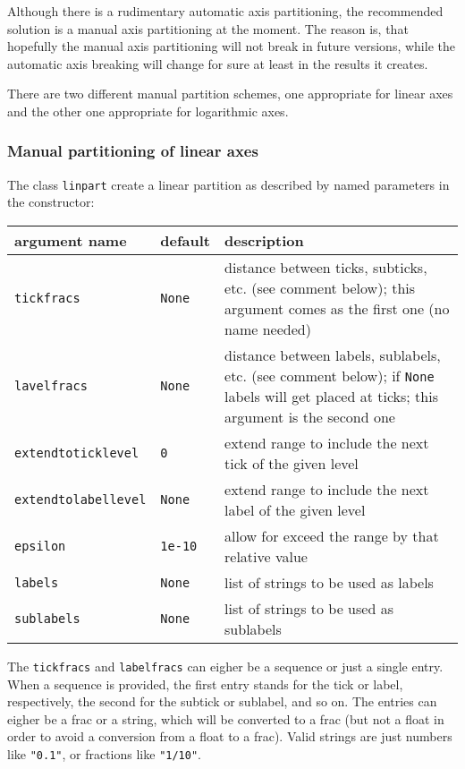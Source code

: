 Although there is a rudimentary automatic axis partitioning, the
recommended solution is a manual axis partitioning at the moment. The
reason is, that hopefully the manual axis partitioning will not break
in future versions, while the automatic axis breaking will change for
sure at least in the results it creates.

There are two different manual partition schemes, one appropriate for
linear axes and the other one appropriate for logarithmic axes.

\subsubsection{Manual partitioning of linear axes}

The class \verb|linpart| create a linear partition as described by
named parameters in the constructor:

\medskip
\begin{tabularx}{\linewidth}{ll>{\raggedright\arraybackslash}X}
argument name&default&description\\
\hline
\texttt{tickfracs}&\texttt{None}&distance between ticks, subticks, etc. (see comment below); this argument comes as the first one (no name needed)\\
\texttt{lavelfracs}&\texttt{None}&distance between labels, sublabels, etc. (see comment below); if \texttt{None} labels will get placed at ticks; this argument is the second one\\
\texttt{extendtoticklevel}&\texttt{0}&extend range to include the next tick of the given level\\
\texttt{extendtolabellevel}&\texttt{None}&extend range to include the next label of the given level\\
\texttt{epsilon}&\texttt{1e-10}&allow for exceed the range by that relative value\\
\texttt{labels}&\texttt{None}&list of strings to be used as labels\\
\texttt{sublabels}&\texttt{None}&list of strings to be used as sublabels\\
\end{tabularx}
\medskip

The \verb|tickfracs| and \verb|labelfracs| can eigher be a sequence or
just a single entry. When a sequence is provided, the first entry
stands for the tick or label, respectively, the second for the
subtick or sublabel, and so on. The entries can eigher be a frac or a
string, which will be converted to a frac (but not a float in order to
avoid a conversion from a float to a frac). Valid strings are just
numbers like \verb|"0.1"|, or fractions like \verb|"1/10"|.

